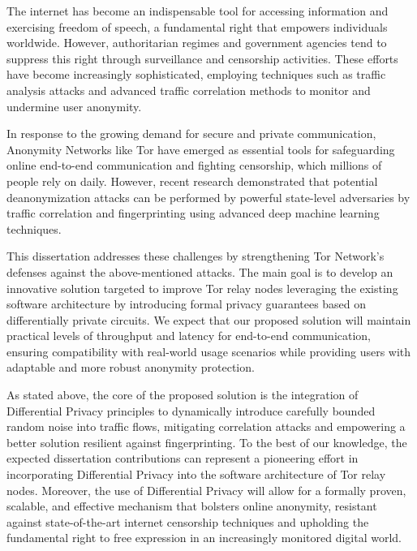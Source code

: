 
%

The internet has become an indispensable tool for accessing information and exercising freedom of speech, a fundamental right that empowers individuals worldwide. However, authoritarian regimes and government agencies tend to suppress this right through surveillance and censorship activities. These efforts have become increasingly sophisticated, employing techniques such as traffic analysis attacks and advanced traffic correlation methods to monitor and undermine user anonymity.

In response to the growing demand for secure and private communication, Anonymity Networks like Tor have emerged as essential tools for safeguarding online end-to-end communication and fighting censorship, which millions of people rely on daily. However, recent research demonstrated that potential deanonymization attacks can be performed by powerful state-level adversaries by traffic correlation and fingerprinting using advanced deep machine learning techniques.

This dissertation addresses these challenges by strengthening Tor Network's defenses against the above-mentioned attacks. The main goal is to develop an innovative solution targeted to improve Tor relay nodes leveraging the existing software architecture by introducing formal privacy guarantees based on differentially private circuits. We expect that our proposed solution will maintain practical levels of throughput and latency for end-to-end communication, ensuring compatibility with real-world usage scenarios while providing users with adaptable and more robust anonymity protection.

As stated above, the core of the proposed solution is the integration of Differential Privacy principles to dynamically introduce carefully bounded random noise into traffic flows, mitigating correlation attacks and empowering a better solution resilient against fingerprinting. 
To the best of our knowledge, the expected dissertation contributions can represent a pioneering effort in incorporating Differential
Privacy into the software architecture of Tor relay nodes. Moreover, the use of Differential Privacy will allow for a formally proven, scalable, and effective mechanism that bolsters online anonymity, resistant against state-of-the-art internet censorship techniques and upholding the fundamental right to free expression in an increasingly monitored digital world.

